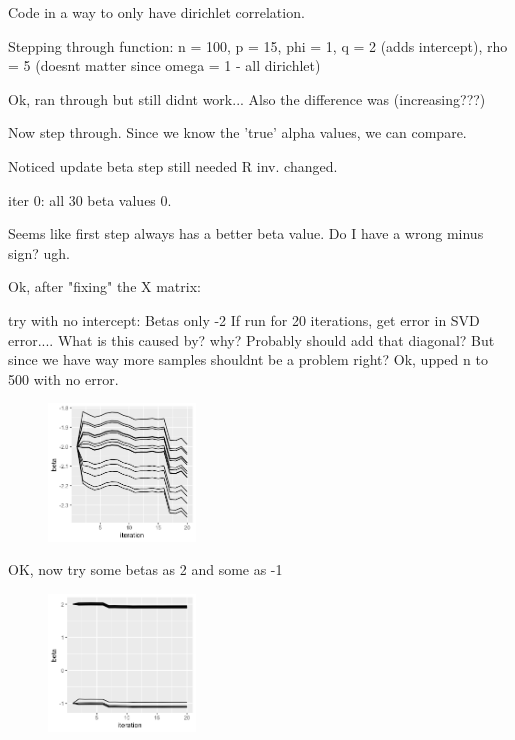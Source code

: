 \documentclass[10pt]{article}
\theoremstyle{definition}
\begin{document}
Code in a way to only have dirichlet correlation.

Stepping through function:
n = 100, p = 15, phi = 1, q = 2 (adds intercept), rho = 5 (doesnt matter since omega = 1 - all dirichlet)


Ok, ran through but still didnt work... Also the difference was (increasing???)

Now step through. Since we know the 'true' alpha values, we can compare.

Noticed update beta step still needed R inv. changed.

iter 0: all 30 beta values 0.

Seems like first step always has a better beta value. Do I have a wrong minus sign? ugh.


Ok, after "fixing" the X matrix:

try with no intercept:
Betas only -2
If run for 20 iterations, get error in SVD error.... What is this caused by? why? Probably should add that diagonal? But since we have way more samples shouldnt be a problem right? Ok, upped n to 500 with no error.

\begin{figure}[!htb]
	\centering
	\includegraphics[width=0.35\textwidth]{img/Temp_week_journal-05cc264a.png}
	\caption{}
	\label{}
\end{figure}

OK, now try some betas as 2 and some as -1

\begin{figure}[!htb]
	\centering
	\includegraphics[width=0.35\textwidth]{img/Temp_week_journal-5e490a3d.png}
	\caption{}
	\label{}
\end{figure}
\end{document}
